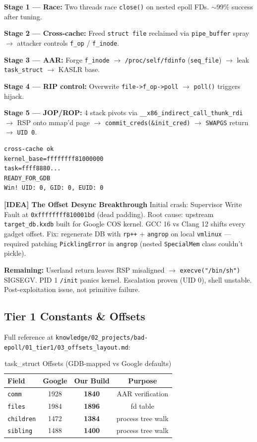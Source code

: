 \documentclass[11pt,a4paper]{article}
\begin{document}
\textbf{Stage 1 --- Race:} Two threads race \texttt{close()} on nested epoll FDs. $\sim$99\% success after tuning.

\textbf{Stage 2 --- Cross-cache:} Freed \texttt{struct file} reclaimed via \texttt{pipe\_buffer} spray $\to$ attacker controls \texttt{f\_op} / \texttt{f\_inode}.

\textbf{Stage 3 --- AAR:} Forge \texttt{f\_inode} $\to$ \texttt{/proc/self/fdinfo} (\texttt{seq\_file}) $\to$ leak \texttt{task\_struct} $\to$ KASLR base.

\textbf{Stage 4 --- RIP control:} Overwrite \texttt{file->f\_op->poll} $\to$ \texttt{poll()} triggers hijack.

\textbf{Stage 5 --- JOP/ROP:} 4 stack pivots via \texttt{\_\_x86\_indirect\_call\_thunk\_rdi} $\to$ RSP onto mmap'd page $\to$ \texttt{commit\_creds(\&init\_cred)} $\to$ \texttt{SWAPGS} return $\to$ \texttt{UID 0}.

\begin{verbatim}
cross-cache ok
kernel_base=ffffffff81000000
task=ffff8880...
READY_FOR_GDB
Win! UID: 0, GID: 0, EUID: 0
\end{verbatim}

\begin{pullquote}
\noindent\textbf{[IDEA] The Offset Desync Breakthrough}
Initial crash: Supervisor Write Fault at \texttt{0xffffffff810001bd} (dead padding). Root cause: upstream \texttt{target\_db.kxdb} built for Google COS kernel. GCC 16 vs Clang 12 shifts every gadget offset. Fix: regenerate DB with \texttt{rp++} + \texttt{angrop} on local \texttt{vmlinux} --- required patching \texttt{PicklingError} in \texttt{angrop} (nested \texttt{SpecialMem} class couldn't pickle).
\end{pullquote}

\textbf{Remaining:} Userland return leaves RSP misaligned $\to$ \texttt{execve("/bin/sh")} SIGSEGV. PID 1 \texttt{/init} panics kernel. Escalation proven (UID 0), shell unstable. Post-exploitation issue, not primitive failure.

\subsection{Tier 1 Constants \& Offsets}
Full reference at \texttt{knowledge/02\_projects/bad-epoll/01\_tier1/03\_offsets\_layout.md}:

\begin{table}[H]
\centering
\caption{task\_struct Offsets (GDB-mapped vs Google defaults)}
\begin{tabular}{lccc}
\toprule
\textbf{Field} & \textbf{Google} & \textbf{Our Build} & \textbf{Purpose} \\
\midrule
\texttt{comm} & 1928 & \textbf{1840} & AAR verification \\
\texttt{files} & 1984 & \textbf{1896} & fd table \\
\texttt{children} & 1472 & \textbf{1384} & process tree walk \\
\texttt{sibling} & 1488 & \textbf{1400} & process tree walk \\
\bottomrule
\end{tabular}
\end{table}
\end{document}
